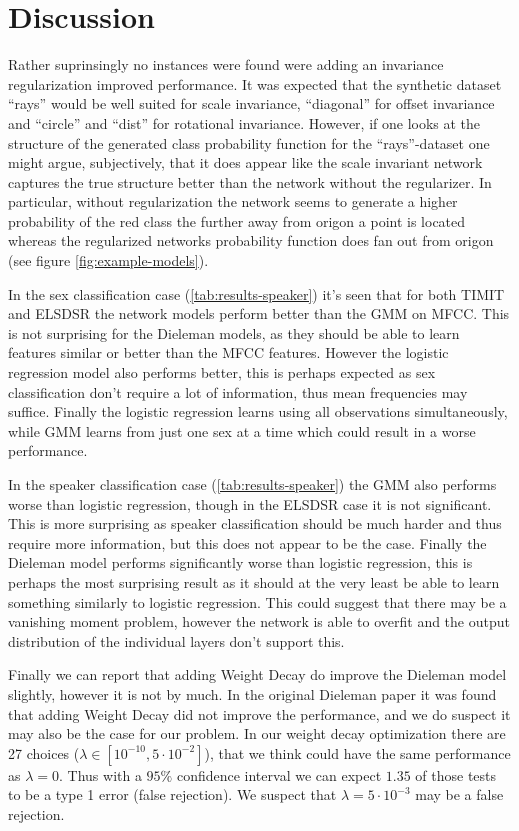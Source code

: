 \section{Discussion}
Rather suprinsingly no instances were found were adding an invariance regularization improved performance. It was expected that the synthetic dataset ``rays'' would be well suited for scale invariance, ``diagonal'' for offset invariance and ``circle'' and ``dist'' for rotational invariance. However, if one looks at the structure of the generated class probability function for the ``rays''-dataset one might argue, subjectively, that it does appear like the scale invariant network captures the true structure better than the network without the regularizer. In particular, without regularization the network seems to generate a higher probability of the red class the further away from origon a point is located whereas  the regularized networks probability function does fan out from origon (see figure \ref{fig:example-models}).

In the sex classification case (\cref{tab:results-speaker}) it's seen that for both TIMIT and ELSDSR the network models perform better than the GMM on MFCC. This is not surprising for the Dieleman models, as they should be able to learn features similar or better than the MFCC features. However the logistic regression model also performs better, this is perhaps expected as sex classification don't require a lot of information, thus mean frequencies may suffice. Finally the logistic regression learns using all observations simultaneously, while GMM learns from just one sex at a time which could result in a worse performance.

In the speaker classification case (\cref{tab:results-speaker}) the GMM also performs worse than logistic regression, though in the ELSDSR case it is not significant. This is more surprising as speaker classification should be much harder and thus require more information, but this does not appear to be the case. Finally the Dieleman model performs significantly worse than logistic regression, this is perhaps the most surprising result as it should at the very least be able to learn something similarly to logistic regression. This could suggest that there may be a vanishing moment problem, however the network is able to overfit and the output distribution of the individual layers don't support this.

Finally we can report that adding Weight Decay do improve the Dieleman model slightly, however it is not by much. In the original Dieleman paper \cite{dieleman} it was found that adding Weight Decay did not improve the performance, and we do suspect it may also be the case for our problem. In our weight decay optimization there are 27 choices ($\lambda \in [10^{-10}, 5 \cdot 10^{-2}]$), that we think could have the same performance as $\lambda = 0$. Thus with a $95\%$ confidence interval we can expect $1.35$ of those tests to be a type 1 error (false rejection). We suspect that $\lambda = 5 \cdot 10^{-3}$ may be a false rejection.

